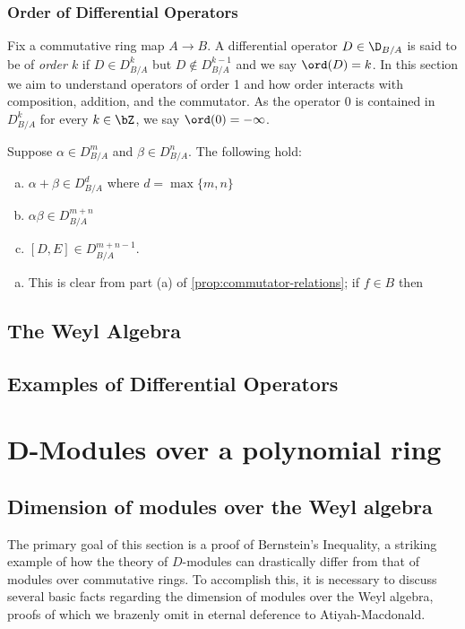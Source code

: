 \subsubsection{Order of Differential Operators}
Fix a commutative ring map $A\to B$. A differential operator $D \in \D_{B/A}$ is said to be of \emph{order $k$} if $D \in D^k_{B/A}$ but $D \not\in D^{k-1}_{B/A}$ and we say $\ord(D) = k$. In this section we aim to understand operators of order 1 and how order interacts with composition, addition, and the commutator. As the operator $0$ is contained in $D^k_{B/A}$ for every $k \in \bZ$, we say $\ord(0) = -\infty$.

\begin{lem}\label{lem:order-interactions}
	 Suppose $\alpha \in D^{m}_{B/A}$ and $\beta \in D^{n}_{B/A}$. The following hold:
	 \begin{enumerate}[(a)]
		 \item $\alpha+\beta \in D^d_{B/A}$ where $d = \max\{m,n\}$
		 \item $\alpha\beta \in D^{m+n}_{B/A}$
		 \item $[D,E] \in D^{m+n -1}_{B/A}$.
	 \end{enumerate}
\end{lem}
\begin{prf}
	\begin{enumerate}[(a)]
		\item This is clear from part (a) of \ref{prop:commutator-relations}; if $f \in B$ then

	\end{enumerate}
\end{prf}
\subsection{The Weyl Algebra}


\subsection{Examples of Differential Operators}
\section{D-Modules over a polynomial ring}

\subsection{Dimension of modules over the Weyl algebra}
The primary goal of this section is a proof of Bernstein's Inequality, a striking example of how the theory of $D$-modules can drastically differ from that of modules over commutative rings. To accomplish this, it is necessary to discuss several basic facts regarding the dimension of modules over the Weyl algebra, proofs of which we brazenly omit in eternal deference to Atiyah-Macdonald.
